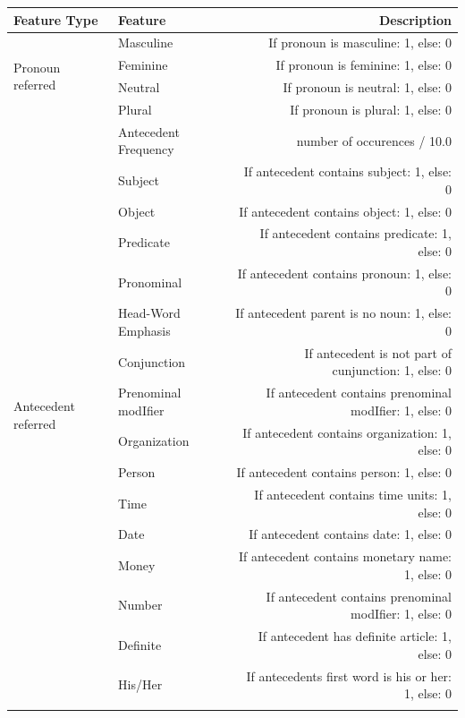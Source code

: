 \begin{table}[p]
  \begin{tabular}{| l | l | r |}

    \hline
    Feature Type & Feature & Description \\ \hline
\hline

	\multirow{4}{1.3cm}{Pronoun referred} & Masculine & If pronoun is masculine: 1, else: 0 \\ \cline{2-3}
 	& Feminine &  If pronoun is feminine: 1, else: 0 \\	\cline{2-3}
	& Neutral &  If pronoun is neutral: 1, else: 0 \\	\cline{2-3}
	 & Plural & If pronoun is plural: 1, else: 0 \\ \hline
	\hline
	\multirow{17}{1.3cm}{Antecedent referred} & Antecedent Frequency & number of occurences / 10.0 \\ \cline{2-3}
 	& Subject &  If antecedent contains subject: 1, else: 0 \\ \cline{2-3}
	& Object &   If antecedent contains object: 1, else: 0 \\	\cline{2-3}
	& Predicate &   If antecedent contains predicate: 1, else: 0 \\ \cline{2-3}
	& Pronominal &  If antecedent contains pronoun: 1, else: 0 \\	\cline{2-3}
	& Head-Word Emphasis &  If antecedent parent is no noun: 1, else: 0 \\	\cline{2-3}
	& Conjunction &  If antecedent is not part of cunjunction: 1, else: 0 \\	\cline{2-3}
	 & Prenominal modIfier & If antecedent contains prenominal modIfier: 1, else: 0 \\ \cline{2-3}
	& Organization & If antecedent contains organization: 1, else: 0 \\ \cline{2-3}
	& Person & If antecedent contains person: 1, else: 0 \\ \cline{2-3}
	& Time & If antecedent contains time units: 1, else: 0 \\ \cline{2-3}
	& Date & If antecedent contains date: 1, else: 0 \\ \cline{2-3}
	& Money & If antecedent contains monetary name: 1, else: 0 \\ \cline{2-3}
	& Number & If antecedent contains prenominal modIfier: 1, else: 0 \\ \cline{2-3}
	& Definite & If antecedent has definite article: 1, else: 0 \\ \cline{2-3}	
	& His/Her & If antecedents first word is his or her: 1, else: 0 \\ \cline{2-3}

\end{tabular}
\end{table}
